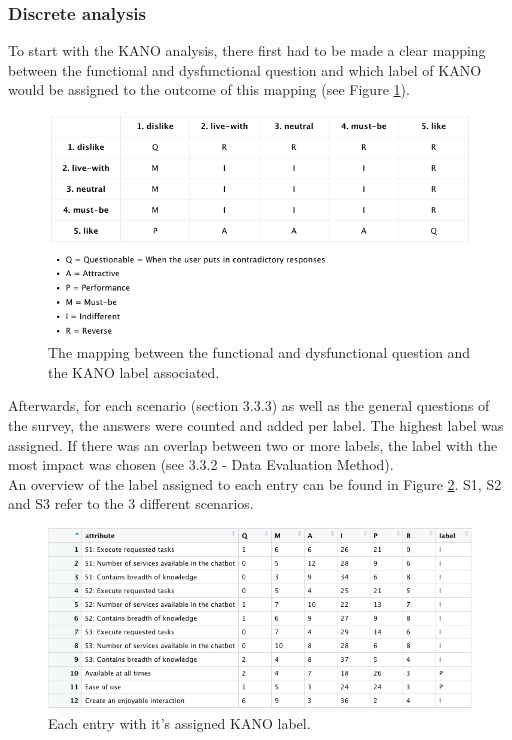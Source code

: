 \subsubsection{Discrete analysis}
To start with the KANO analysis, there first had to be made a clear mapping between the functional and dysfunctional question and which label of KANO would be assigned to the outcome of this mapping (see Figure \ref{fig:kanoOverview}).
\begin{figure}[htb!]
	\centering
	\includegraphics[width=\linewidth]{../LaTeX/Figures/Kano/KANOOverview.png}
	\caption{The mapping between the functional and dysfunctional question and the KANO label associated.}
	\label{fig:kanoOverview}
\end{figure}
\break
Afterwards, for each scenario (section 3.3.3) as well as the general questions of the survey, the answers were counted and added per label. The highest label was assigned. If there was an overlap between two or more labels, the label with the most impact was chosen (see 3.3.2 - Data Evaluation Method).\\
An overview of the label assigned to each entry can be found in Figure \ref{fig:kanoTable}. S1, S2 and S3 refer to the 3 different scenarios.
\begin{figure}[!htb]
	\centering
	\includegraphics[width=\linewidth, scale=0.7]{../LaTeX/Figures/Kano/KanoTable.png}
	\caption{Each entry with it's assigned KANO label.}
	\label{fig:kanoTable}
\end{figure}

